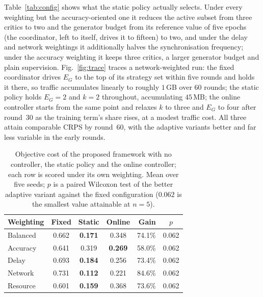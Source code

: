 \documentclass[journal]{IEEEtran}
\begin{document}
Table~\ref{tab:config} shows what the static policy actually selects. Under
every weighting but the accuracy-oriented one it reduces the active subset from
three critics to two and the generator budget from its reference value of five
epochs (the coordinator, left to itself, drives it to fifteen) to two, and
under the delay and network weightings it additionally halves the
synchronisation frequency; under the accuracy weighting it keeps three critics,
a larger generator budget and plain supervision. Fig.~\ref{fig:trace} traces a
network-weighted run: the fixed coordinator drives $E_G$ to the top of its
strategy set within five rounds and holds it there, so traffic accumulates
linearly to roughly $1$\,GB over 60 rounds; the static policy holds $E_G=2$ and
$k=2$ throughout, accumulating $45$\,MB; the online controller starts from the
same point and relaxes $k$ to three and $E_G$ to four after round~30 as the
training term's share rises, at a modest traffic cost. All three attain
comparable CRPS by round~60, with the adaptive variants better and far less
variable in the early rounds.

\begin{table}[!t]
\centering
\caption{Objective cost of the proposed framework with no controller, the static
policy and the online controller; each row is scored under its own weighting.
Mean over five seeds; $p$ is a paired Wilcoxon test of the better adaptive
variant against the fixed configuration ($0.062$ is the smallest value
attainable at $n=5$).}
\label{tab:modes}
\begin{tabular}{lcccrc}
\toprule
Weighting & Fixed & Static & Online & Gain & $p$ \\
\midrule
Balanced & 0.662 & \textbf{0.171} & 0.348 & 74.1\% & 0.062 \\
Accuracy & 0.641 & 0.319 & \textbf{0.269} & 58.0\% & 0.062 \\
Delay & 0.693 & \textbf{0.184} & 0.256 & 73.4\% & 0.062 \\
Network & 0.731 & \textbf{0.112} & 0.221 & 84.6\% & 0.062 \\
Resource & 0.601 & \textbf{0.159} & 0.368 & 73.6\% & 0.062 \\
\bottomrule
\end{tabular}
\end{table}
\end{document}
